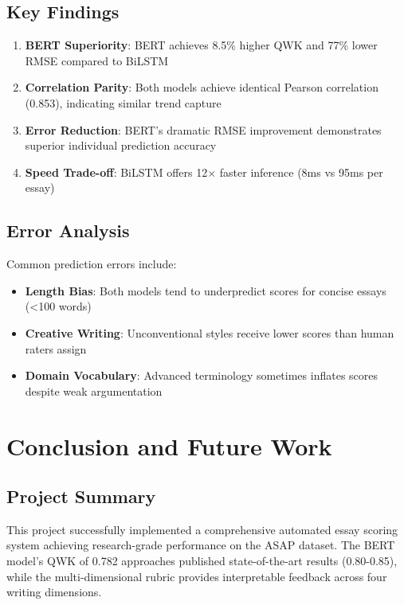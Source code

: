 \documentclass[12pt,a4paper]{article}
\begin{document}
\subsection{Key Findings}
\begin{enumerate}
    \item \textbf{BERT Superiority}: BERT achieves 8.5\% higher QWK and 77\% lower RMSE compared to BiLSTM
    \item \textbf{Correlation Parity}: Both models achieve identical Pearson correlation (0.853), indicating similar trend capture
    \item \textbf{Error Reduction}: BERT's dramatic RMSE improvement demonstrates superior individual prediction accuracy
    \item \textbf{Speed Trade-off}: BiLSTM offers 12$\times$ faster inference (8ms vs 95ms per essay)
\end{enumerate}

\subsection{Error Analysis}
Common prediction errors include:
\begin{itemize}
    \item \textbf{Length Bias}: Both models tend to underpredict scores for concise essays (<100 words)
    \item \textbf{Creative Writing}: Unconventional styles receive lower scores than human raters assign
    \item \textbf{Domain Vocabulary}: Advanced terminology sometimes inflates scores despite weak argumentation
\end{itemize}

\newpage
\section{Conclusion and Future Work}

\subsection{Project Summary}
This project successfully implemented a comprehensive automated essay scoring system achieving research-grade performance on the ASAP dataset. The BERT model's QWK of 0.782 approaches published state-of-the-art results (0.80-0.85), while the multi-dimensional rubric provides interpretable feedback across four writing dimensions.
\end{document}
